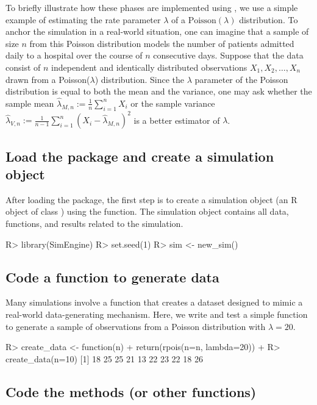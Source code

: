 To briefly illustrate how these phases are implemented using , we use a simple example of estimating the rate parameter $\lambda$ of a $\text{Poisson}(\lambda)$ distribution. To anchor the simulation in a real-world situation, one can imagine that a sample of size $n$ from this Poisson distribution models the number of patients admitted daily to a hospital over the course of $n$ consecutive days. Suppose that the data consist of $n$ independent and identically distributed observations $X_1, X_2, \ldots, X_n$ drawn from a Poisson($\lambda$) distribution. Since the $\lambda$ parameter of the Poisson distribution is equal to both the mean and the variance, one may ask whether the sample mean $\hat{\lambda}_{M,n}:= \frac{1}{n}\sum_{i=1}^{n}X_i$ or the sample variance $\hat{\lambda}_{V,n} := \frac{1}{n-1}\sum_{i=1}^{n}(X_i - \hat{\lambda}_{M,n})^2$ is a better estimator of $\lambda$.

\subsection{Load the package and create a simulation object}

After loading the package, the first step is to create a simulation object (an R object of class ) using the  function. The simulation object contains all data, functions, and results related to the simulation.

\begin{example}
R> library(SimEngine)
R> set.seed(1)
R> sim <- new_sim()
\end{example}

\subsection{Code a function to generate data}

Many simulations involve a function that creates a dataset designed to mimic a real-world data-generating mechanism. Here, we write and test a simple function to generate a sample of  observations from a Poisson distribution with $\lambda = 20$.

\begin{example}
R> create_data <- function(n) {
+    return(rpois(n=n, lambda=20))
+  }
R> create_data(n=10)
 [1] 18 25 25 21 13 22 23 22 18 26
\end{example}

\subsection{Code the methods (or other functions)}

